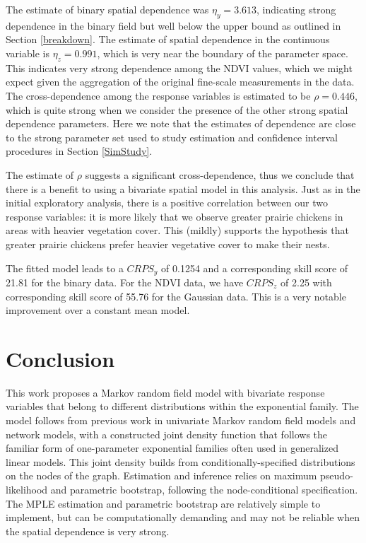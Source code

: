 \documentclass[12pt, a4paper, twoside]{article}
\begin{document}
The estimate of binary spatial dependence was $\eta_y = 3.613$, indicating strong dependence in the binary field but well below the upper bound as outlined in Section \ref{breakdown}. The estimate of spatial dependence in the continuous variable is $\eta_z = 0.991$, which is very near the boundary of the parameter space. This indicates very strong dependence among the NDVI values, which we might expect given the aggregation of the original fine-scale measurements in the data. The cross-dependence among the response variables is estimated to be $\rho = 0.446$, which is quite strong when we consider the presence of the other strong spatial dependence parameters. Here we note that the estimates of dependence are close to the strong parameter set used to study estimation and confidence interval procedures in Section \ref{SimStudy}.

The estimate of $\rho$ suggests a significant cross-dependence, thus we conclude that there is a benefit to using a bivariate spatial model in this analysis. Just as in the initial exploratory analysis, there is a positive correlation between our two response variables: it is more likely that we observe greater prairie chickens in areas with heavier vegetation cover. This (mildly) supports the hypothesis that greater prairie chickens prefer heavier vegetative cover to make their nests.

The fitted model leads to a $CRPS_y$ of 0.1254 and a corresponding skill score of 21.81 for the binary data. For the NDVI data, we have $CRPS_z$ of 2.25 with corresponding skill score of 55.76 for the Gaussian data. This is a very notable improvement over a constant mean model.

\section{Conclusion} \label{Conclusion}
This work proposes a Markov random field model with bivariate response variables that belong to different distributions within the exponential family. The model follows from previous work in univariate Markov random field models and network models, with a constructed joint density function that follows the familiar form of one-parameter exponential families often used in generalized linear models. This joint density builds from conditionally-specified distributions on the nodes of the graph. Estimation and inference relies on maximum pseudo-likelihood and parametric bootstrap, following the node-conditional specification. The MPLE estimation and parametric bootstrap are relatively simple to implement, but can be computationally demanding and may not be reliable when the spatial dependence is very strong.
\end{document}
